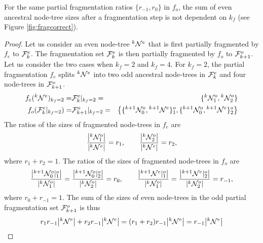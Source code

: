 \begin{lemma}\label{lem:sumevenkf}
  For the same partial fragmentation ratios $\{r_{-1}, r_0\}$ in $f_o$, the sum of even ancestral node-tree sizes after a fragmentation step is not dependent on $k_f$ (see Figure \ref{fig:fragcorrect}). 
\end{lemma}
\begin{proof}
  Let us consider an even node-tree ${}^{k}\mathcal{N}^e$ that is first partially fragmented by $f_e$ to $\mathcal{F}^e_k$. The fragmentation set $\mathcal{F}^e_k$ is then partially fragmented by $f_o$ to $\mathcal{F}_{k+1}^o$. Let us consider the two cases when $k_f=2$ and $k_f=4$. For $k_f=2$, the partial fragmentation $f_e$ splits ${}^{k}\mathcal{N}^e$ into two odd ancestral node-trees in $\mathcal{F}^e_k$ and four node-trees in $\mathcal{F}_{k+1}^o$.
  \begin{eqnarray*}
    f_e({}^{k}\mathcal{N}^e)_{k_f = 2} 
    =& \mathcal{F}^e_{k}|_{k_f = 2} 
    =& \{ {}^{k} \mathcal{N}^{o}_1, {}^{k} \mathcal{N}^{o}_2\}  \\
    f_o(\mathcal{F}^e_{k}|_{k_f = 2}) 
    =& \mathcal{F}^o_{k+1}|_{k_f = 2} 
    =& \left\{ \{{}^{k+1}\mathcal{N}^{o}_{0}, {}^{k+1}\mathcal{N}^{e}\}^o_1 , \{{}^{k+1}\mathcal{N}^{o}_{0}, {}^{k+1}\mathcal{N}^{e} \}^o_2 \right\}
  \end{eqnarray*}
  The ratios of the sizes of fragmented node-trees in $f_e$ are
  \begin{equation*}
    \frac{\abs{{}^{k} \mathcal{N}^{o}_1}}{\abs{{}^{k}\mathcal{N}^e}} = r_1, \hspace{2em}
    \frac{\abs{{}^{k} \mathcal{N}^{o}_2}}{\abs{{}^{k}\mathcal{N}^e}} = r_2, 
  \end{equation*}
  where $ r_1 + r_2 = 1$. The ratios of the sizes of fragmented node-trees in $f_o$ are
  \begin{equation*}
    \frac{\abs{{}^{k+1}\mathcal{N}^{o}_0|^o_1}}{\abs{{}^{k} \mathcal{N}^{o}_1}} = 
    \frac{\abs{{}^{k+1}\mathcal{N}^{o}_0|^o_2}}{\abs{{}^{k} \mathcal{N}^{o}_2}} = r_0, \hspace{2em}
    \frac{\abs{{}^{k+1}\mathcal{N}^{e}  |^o_1}}{\abs{{}^{k} \mathcal{N}^{o}_1}} = 
    \frac{\abs{{}^{k+1}\mathcal{N}^{e}  |^o_2}}{\abs{{}^{k} \mathcal{N}^{o}_2}} = r_{-1},  
  \end{equation*}
  where $r_0 + r_{-1} = 1$. The sum of the sizes of even node-trees in the odd partial fragmentation set $\mathcal{F}^o_{k+1}$ is thus
  \begin{equation*}
    r_1 r_{-1} \abs{{}^{k}\mathcal{N}^e} + r_2 r_{-1} \abs{{}^{k}\mathcal{N}^e} = (r_1 + r_2) r_{-1} \abs{{}^{k}\mathcal{N}^e} = r_{-1} \abs{{}^{k}\mathcal{N}^e}
  \end{equation*}


\end{proof}
